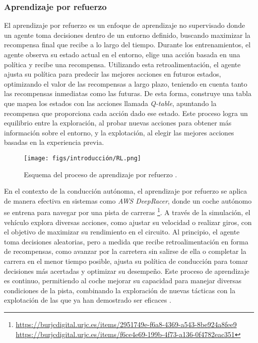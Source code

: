\subsubsection{Aprendizaje por refuerzo}

El aprendizaje por refuerzo es un enfoque de aprendizaje no supervisado donde un agente toma decisiones dentro de un entorno definido, buscando maximizar la recompensa final que recibe a lo largo del tiempo. Durante los entrenamientos, el agente observa su estado actual en el entorno, elige una acción basada en una política y recibe una recompensa. Utilizando esta retroalimentación, el agente ajusta su política para predecir las mejores acciones en futuros estados, optimizando el valor de las recompensas a largo plazo, teniendo en cuenta tanto las recompensas inmediatas como las futuras. De esta forma, construye una tabla que mapea los estados con las acciones llamada \textit{Q-table}, apuntando la recompensa que proporciona cada acción dado ese estado. Este proceso logra un equilibrio entre la exploración, al probar nuevas acciones para obtener más información sobre el entorno, y la explotación, al elegir las mejores acciones basadas en la experiencia previa.

\begin{figure}[ht]
\begin{center}
\texttt{[image: figs/introducción/RL.png]}
\end{center}
\caption{Esquema del proceso de aprendizaje por refuerzo \cite{reinforcement-learning-schema}.}
\label{rl}
\end{figure}

En el contexto de la conducción autónoma, el aprendizaje por refuerzo se aplica de manera efectiva en sistemas como \textit{AWS DeepRacer}, donde un coche autónomo se entrena para navegar por una pista de carreras \footnote{\url{https://burjcdigital.urjc.es/items/2951749e-f6a8-4369-a543-8be924a8fee9}\\ \url{ https://burjcdigital.urjc.es/items/f6ce4e69-199b-4f73-a136-0f4782eac351}}. A través de la simulación, el vehículo explora diversas acciones, como ajustar su velocidad o realizar giros, con el objetivo de maximizar su rendimiento en el circuito. Al principio, el agente toma decisiones aleatorias, pero a medida que recibe retroalimentación en forma de recompensas, como avanzar por la carretera sin salirse de ella o completar la carrera en el menor tiempo posible, ajusta su política de conducción para tomar decisiones más acertadas y optimizar su desempeño. Este proceso de aprendizaje es continuo, permitiendo al coche mejorar su capacidad para manejar diversas condiciones de la pista, combinando la exploración de nuevas tácticas con la explotación de las que ya han demostrado ser eficaces \cite{aws-deep-racer}.

